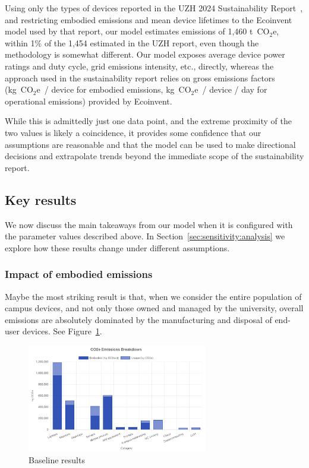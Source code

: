\documentclass[11pt]{article}
\newcommand{\coe}{CO$_2$e}
\newcommand{\gcoe}{g~\coe}
\newcommand{\tcoe}{t~\coe}
\newcommand{\kgcoe}{k\gcoe}
\begin{document}
Using only the types of devices reported in the UZH 2024 Sustainability Report~\cite{uzh:sustainability:report}, and restricting embodied emissions and mean device lifetimes to the Ecoinvent~\cite{ecoinvent} model used by that report, our model estimates emissions of 1,460 \tcoe, within 1\% of the 1,454 estimated in the UZH report, even though the methodology is somewhat different. Our model exposes average device power ratings and duty cycle, grid emissions intensity, etc., directly, whereas the approach used in the sustainability report relies on gross emissions factors (\kgcoe\ / device for embodied emissions, \kgcoe\ / device / day for operational emissions) provided by Ecoinvent.

While this is admittedly just one data point, and the extreme proximity of the two values is likely a coincidence, it provides some confidence that our assumptions are reasonable and that the model can be used to make directional decisions and extrapolate trends beyond the immediate scope of the sustainability report.

\subsection{Key results}

We now discuss the main takeaways from our model when it is configured with the parameter values described above. In Section~\ref{sec:sensitivity:analysis} we explore how these results change under different assumptions.

\subsubsection*{Impact of embodied emissions}

Maybe the most striking result is that, when we consider the entire population of campus devices, and not only those owned and managed by the university, overall emissions are absolutely dominated by the manufacturing and disposal of end-user devices. See Figure~\ref{fig:baseline}.

\begin{figure}[h]
  \centering
  \includegraphics[width=0.7\textwidth]{fig-baseline.png}
  \caption{Baseline results}
  \label{fig:baseline}
\end{figure}
\end{document}
